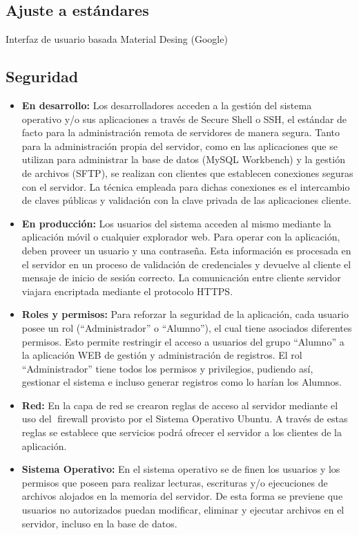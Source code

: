     \subsection{Ajuste a estándares} Interfaz de usuario basada Material Desing (Google)

    \subsection{Seguridad} 
      \begin{itemize}
        
        \item \textbf{En desarrollo:} Los desarrolladores acceden a la gestión del sistema operativo y/o sus aplicaciones a través de Secure Shell o SSH, el estándar de facto para la administración remota de servidores de manera segura. Tanto para la administración propia del servidor, como en las aplicaciones que se utilizan para administrar la base de datos (MySQL Workbench) y la gestión de archivos (SFTP), se realizan con clientes que establecen conexiones seguras con el servidor. La técnica empleada para dichas conexiones es el intercambio de claves públicas y validación con la clave privada de las aplicaciones cliente.
        \item \textbf{En producción:} Los usuarios del sistema acceden al mismo mediante la aplicación móvil o cualquier explorador web. Para operar con la aplicación, deben proveer un usuario y una contraseña. Esta información es procesada en el servidor en un proceso de validación de credenciales y devuelve al cliente el mensaje de inicio de sesión correcto. La comunicación entre cliente servidor viajara encriptada mediante el protocolo HTTPS.
        \item \textbf{Roles y permisos:} Para reforzar la seguridad de la aplicación, cada usuario posee un rol (``Administrador'' o ``Alumno''), el cual tiene asociados diferentes permisos. Esto permite restringir el acceso a usuarios del grupo ``Alumno'' a la aplicación WEB de gestión y administración de registros. El rol ``Administrador'' tiene todos los permisos y privilegios, pudiendo así, gestionar el sistema e incluso generar registros como lo harían los Alumnos.
        \item \textbf{Red:} En la capa de red se crearon reglas de acceso al servidor mediante el uso del firewall provisto por el Sistema Operativo Ubuntu. A través de estas reglas se establece que servicios podrá ofrecer el servidor a los clientes de la aplicación.
        \item \textbf{Sistema Operativo:} En el sistema operativo se definen los usuarios y los permisos que poseen para realizar lecturas, escrituras y/o ejecuciones de archivos alojados en la memoria del servidor. De esta forma se previene que usuarios no autorizados puedan modificar, eliminar y ejecutar archivos en el servidor, incluso en la base de datos.

\end{itemize}
